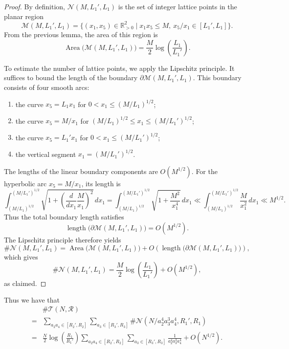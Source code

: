 \documentclass[table]{amsart}
\newcommand{\op}[1]{\operatorname{#1}}
\numberwithin{equation}{section}
\begin{document}
\begin{proof}
By definition, $\mathcal{N}(M,L_1',L_1)$ is the set of integer lattice points in the planar region
\[
\mathcal{M}(M,L_1',L_1)
=
\{(x_1,x_5)\in\mathbb{R}_{>0}^2 \mid x_1x_5\le M,\ x_5/x_1\in[L_1',L_1]\}.
\]
From the previous lemma, the area of this region is
\[
\op{Area}\big(\mathcal{M}(M,L_1',L_1)\big)
=
\frac{M}{2}\log\!\left(\frac{L_1}{L_1'}\right).
\]

To estimate the number of lattice points, we apply the Lipschitz principle.
It suffices to bound the length of the boundary $\partial\mathcal{M}(M,L_1',L_1)$.
This boundary consists of four smooth arcs:
\begin{enumerate}
\item the curve $x_5=L_1x_1$ for $0<x_1\le (M/L_1)^{1/2}$;
\item the curve $x_5=M/x_1$ for $(M/L_1)^{1/2}\le x_1\le (M/L_1')^{1/2}$;
\item the curve $x_5=L_1'x_1$ for $0<x_1\le (M/L_1')^{1/2}$;
\item the vertical segment $x_1=(M/L_1')^{1/2}$.
\end{enumerate}

The lengths of the linear boundary components are $O(M^{1/2})$.
For the hyperbolic arc $x_5=M/x_1$, its length is
\[
\int_{(M/L_1)^{1/2}}^{(M/L_1')^{1/2}}
\sqrt{1+\left(\frac{d}{dx_1}\frac{M}{x_1}\right)^2}\,dx_1
=
\int_{(M/L_1)^{1/2}}^{(M/L_1')^{1/2}}
\sqrt{1+\frac{M^2}{x_1^4}}\,dx_1
\ll
\int_{(M/L_1)^{1/2}}^{(M/L_1')^{1/2}}
\frac{M}{x_1^2}\,dx_1
\ll M^{1/2}.
\]
Thus the total boundary length satisfies
\[
\op{length}\big(\partial\mathcal{M}(M,L_1',L_1)\big)=O(M^{1/2}).
\]
\noindent The Lipschitz principle therefore yields
\[
\#\mathcal{N}(M,L_1',L_1)
=
\op{Area}\big(\mathcal{M}(M,L_1',L_1)\big)
+
O\!\left(\op{length}\big(\partial\mathcal{M}(M,L_1',L_1)\big)\right),
\]
which gives
\[
\#\mathcal{N}(M,L_1',L_1)
=
\frac{M}{2}\log\!\left(\frac{L_1}{L_1'}\right)
+
O\!\left(M^{1/2}\right),
\]
as claimed.
\end{proof}

\par Thus we have that 
\[\begin{split}&\#\mathcal{T}(N,\mathscr{R})\\
=&\sum_{a_2a_4\in [R_2',R_2]}\sum_{a_3\in [R_3',R_3]} \#\mathcal{N}\left(N/a_2^4a_3^3a_4^4, R_1', R_1\right)\\
=& \frac{N}{2}\log\!\left(\frac{R_1}{R_1'}\right)\sum_{a_2a_4\in [R_2',R_2]}\sum_{a_3\in [R_3',R_3]}\frac{1}{a_2^4a_3^3a_4^4}+O(N^{1/2}).
\end{split}\]
\end{document}
